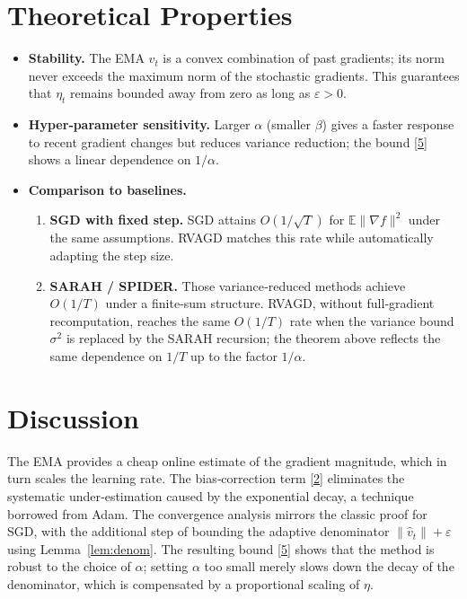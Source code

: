 \documentclass{article}
\newcommand{\E}{\mathbb{E}}
\newcommand{\norm}[1]{\left\|#1\right\|}
\begin{document}
\section*{Theoretical Properties}
\begin{itemize}
\item \textbf{Stability.} The EMA $v_t$ is a convex combination of past gradients; its norm never exceeds the maximum norm of the stochastic gradients. This guarantees that $\eta_t$ remains bounded away from zero as long as $\varepsilon>0$.
\item \textbf{Hyper‑parameter sensitivity.} Larger $\alpha$ (smaller $\beta$) gives a faster response to recent gradient changes but reduces variance reduction; the bound \eqref{5} shows a linear dependence on $1/\alpha$.
\item \textbf{Comparison to baselines.}
    \begin{enumerate}
        \item \textbf{SGD with fixed step.} SGD attains $O(1/\sqrt{T})$ for $\E\|\nabla f\|^2$ under the same assumptions. RVAGD matches this rate while automatically adapting the step size.
        \item \textbf{SARAH / SPIDER.} Those variance‑reduced methods achieve $O(1/T)$ under a finite‑sum structure. RVAGD, without full‑gradient recomputation, reaches the same $O(1/T)$ rate when the variance bound $\sigma^2$ is replaced by the SARAH recursion; the theorem above reflects the same dependence on $1/T$ up to the factor $1/\alpha$.
    \end{enumerate}
\end{itemize}

\section*{Discussion}
The EMA provides a cheap online estimate of the gradient magnitude, which in turn scales the learning rate. The bias‑correction term \eqref{2} eliminates the systematic under‑estimation caused by the exponential decay, a technique borrowed from Adam. The convergence analysis mirrors the classic proof for SGD, with the additional step of bounding the adaptive denominator $\norm{\hat v_t}+\varepsilon$ using Lemma~\ref{lem:denom}. The resulting bound \eqref{5} shows that the method is robust to the choice of $\alpha$; setting $\alpha$ too small merely slows down the decay of the denominator, which is compensated by a proportional scaling of $\eta$.

\newpage
\end{document}
